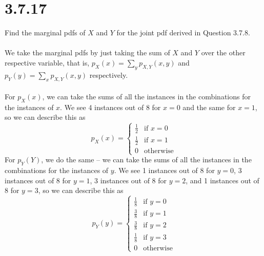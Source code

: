\documentclass{article}
\begin{document}
{\section*{3.7.17} 
Find the marginal pdfs of \(X\) and \(Y\) for the joint pdf derived in Question 3.7.8.
\\
\\
We take the marginal pdfs by just taking the sum of \(X\) and \(Y\) over the other respective variable, that is, \(p_X(x) = \sum_{y} p_{X,Y}(x, y)\) and \(p_Y(y) = \sum_{x} p_{X,Y}(x, y)\) respectively.
\\
\\
For \(p_X(x)\), we can take the sums of all the instances in the combinations for the instances of \(x\). We see 4 instances out of 8 for \(x=0\) and the same for \(x=1\), so we can describe this as 
\[
p_X(x) = 
\begin{cases}
\frac{1}{2} & \text{if } x = 0 \\
\frac{1}{2} & \text{if } x = 1 \\
0 & \text{otherwise}
\end{cases}
\]
For \(p_Y(Y)\), we do the same -- we can take the sums of all the instances in the combinations for the instances of \(y\). We see 1 instances out of 8 for \(y=0\), 3 instances out of 8 for \(y=1\), 3 instances out of 8 for \(y=2\), and 1 instances out of 8 for \(y=3\), so we can describe this as 
\[
p_Y(y) = 
\begin{cases}
\frac{1}{8} & \text{if } y = 0 \\
\frac{3}{8} & \text{if } y = 1 \\
\frac{3}{8} & \text{if } y = 2 \\
\frac{1}{8} & \text{if } y = 3 \\
0 & \text{otherwise}
\end{cases}
\]

}
\end{document}
